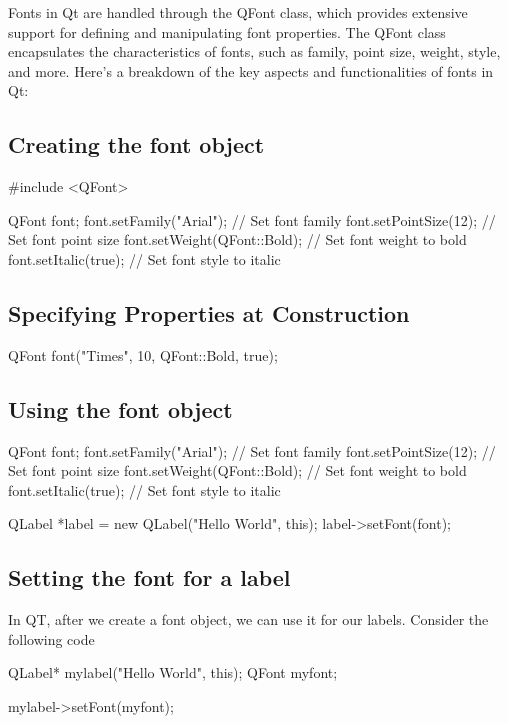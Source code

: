 \documentclass{report}
\begin{document}
    \pagebreak 
    \bigbreak \noindent 
    \begin{concept}
        Fonts in Qt are handled through the QFont class, which provides extensive support for defining and manipulating font properties. The QFont class encapsulates the characteristics of fonts, such as family, point size, weight, style, and more. Here's a breakdown of the key aspects and functionalities of fonts in Qt:
    \end{concept}
    \bigbreak \noindent 
    \subsection{Creating the font object}
    \bigbreak \noindent 
    \begin{cppcode}
    #include <QFont>

    QFont font;
    font.setFamily("Arial");      // Set font family
    font.setPointSize(12);        // Set font point size
    font.setWeight(QFont::Bold);  // Set font weight to bold
    font.setItalic(true);         // Set font style to italic
    \end{cppcode}

    \bigbreak \noindent 
    \subsection{Specifying Properties at Construction}
    \bigbreak \noindent 
    \begin{cppcode}
    QFont font("Times", 10, QFont::Bold, true);
    \end{cppcode}

    \bigbreak \noindent 
    \subsection{Using the font object}
    \bigbreak \noindent 
    \begin{cppcode}
    QFont font;
    font.setFamily("Arial");      // Set font family
    font.setPointSize(12);        // Set font point size
    font.setWeight(QFont::Bold);  // Set font weight to bold
    font.setItalic(true);         // Set font style to italic

    QLabel *label = new QLabel("Hello World", this);
    label->setFont(font);
    \end{cppcode}

    \bigbreak \noindent 
    \subsection{Setting the font for a label}
    \bigbreak \noindent 
    In QT, after we create a font object, we can use it for our labels. Consider the following code
    \bigbreak \noindent 
    \begin{cppcode}
    QLabel* mylabel("Hello World", this);
    QFont myfont;

    mylabel->setFont(myfont);
    \end{cppcode}
\end{document}
